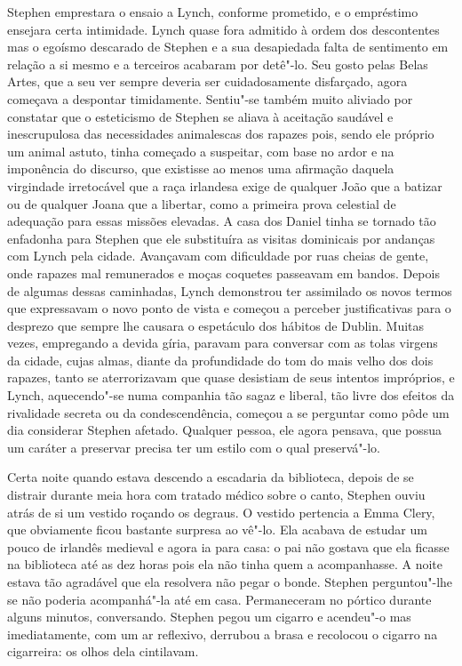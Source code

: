 Stephen emprestara o ensaio a Lynch, conforme prometido, e o empréstimo
ensejara certa intimidade.  Lynch quase fora admitido à ordem dos descontentes
mas o egoísmo descarado de Stephen e a sua desapiedada falta de sentimento em
relação a si mesmo e a terceiros acabaram por detê"-lo.  Seu gosto pelas Belas
Artes, que a seu ver sempre deveria ser cuidadosamente disfarçado, agora
começava a despontar timidamente.  Sentiu"-se também muito \mbox{aliviado} por
constatar que o esteticismo de Stephen se aliava à aceitação saudável e
inescrupulosa das necessidades animalescas dos rapazes pois, sendo ele próprio
um animal astuto, tinha começado a \label{suspeitar"-com} suspeitar, com base no ardor e na
imponência do discurso, que existisse ao menos uma afirmação daquela virgindade
irretocável que a raça irlandesa exige de qualquer João que a batizar ou de
qualquer Joana que a libertar, como a primeira prova celestial de adequação
para essas missões elevadas.  A casa dos Daniel tinha se tornado tão enfadonha
para Stephen que ele substituíra as visitas dominicais por andanças com Lynch
pela cidade.  Avançavam com dificuldade por ruas cheias de gente, onde rapazes
mal remunerados e moças coquetes passeavam em bandos.  Depois de algumas dessas
caminhadas, Lynch demonstrou ter assimilado os novos termos que expressavam o
novo ponto de vista e começou a perceber justificativas para o desprezo que
sempre lhe causara o espetáculo dos hábitos de Dublin.  Muitas vezes,
empregando a devida gíria, paravam para conversar com as tolas virgens da
cidade, cujas almas, diante da profundidade do tom do mais velho dos dois
rapazes, tanto se aterrorizavam que quase desistiam de seus intentos
impróprios, e Lynch, aquecendo"-se numa companhia tão sagaz e liberal, tão livre
dos efeitos da rivalidade secreta ou da condescendência, começou a se perguntar
como pôde um dia considerar Stephen afetado.  Qualquer pessoa, ele agora
pensava, que possua um caráter a preservar precisa ter um estilo com o qual
preservá"-lo.

Certa noite quando estava descendo a escadaria da biblioteca, depois de se
distrair durante meia hora com tratado médico sobre o canto,		
Stephen ouviu atrás de si um vestido roçando os degraus.  O vestido
pertencia a Emma Clery, que obviamente ficou bastante surpresa ao vê"-lo.  Ela
acabava de estudar um pouco de irlandês medieval e agora ia para casa: o pai
não gostava que ela ficasse na biblioteca até as dez horas pois ela não tinha
quem a acompanhasse.  A noite estava tão agradável que ela resolvera não pegar
o bonde.  Stephen perguntou"-lhe se não poderia acompanhá"-la até em casa.
Permaneceram no pórtico durante alguns minutos, conversando.  Stephen pegou um
cigarro e acendeu"-o mas imediatamente, com um ar reflexivo, derrubou
a brasa e recolocou o cigarro na cigarreira: os olhos dela cintilavam.

